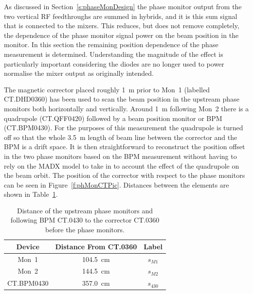 As discussed in Section~\ref{s:phaseMonDesign} the phase monitor output from the two vertical RF feedthroughs are summed in hybrids, and it is this sum signal that is connected to the mixers. This reduces, but does not remove completely, the dependence of the phase monitor signal power on the beam position in the monitor. In this section the remaining position dependence of the phase measurement is determined. Understanding the magnitude of the effect is particularly important considering the diodes are no longer used to power normalise the mixer output as originally intended.

The magnetic corrector placed roughly 1~m prior to Mon~1 (labelled CT.DHD0360) has been used to scan the beam position in the upstream phase monitors both horizontally and vertically. Around 1~m following Mon~2 there is a quadrupole (CT.QFF0420) followed by a beam position monitor or BPM (CT.BPM0430). For the purposes of this measurement the quadrupole is turned off so that the whole 3.5~m length of beam line between the corrector and the BPM is a drift space. It is then straightforward to reconstruct the position offset in the two phase monitors based on the BPM measurement without having to rely on the MADX model to take in to account the effect of the quadrupole on the beam orbit. The position of the corrector with respect to the phase monitors can be seen in Figure~\ref{f:phMonCTPic}. Distances between the elements are shown in Table~\ref{t:distanceFromCT360}.


\begin{table}
  \begin{center}
    \begin{tabular}{|c c c|}
	   \hline
       Device & Distance From CT.0360 & Label\\ \hline
       Mon~1 & 104.5~cm & \(s_{M1}\)\\ 
       Mon~2 & 144.5~cm & \(s_{M2}\)\\
       CT.BPM0430 & 357.0~cm & \(s_{430}\) \\ \hline
    \end{tabular}
    \caption{Distance of the upstream phase monitors and following BPM CT.0430 to the corrector CT.0360 before the phase monitors.}
  	\label{t:distanceFromCT360}
  \end{center}
\end{table}


